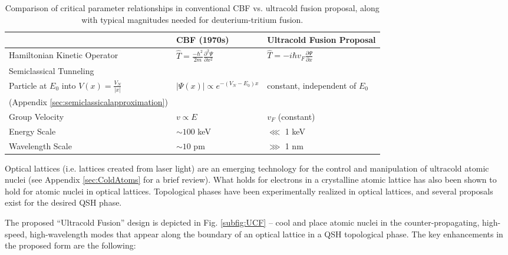 \documentclass[onecolumn,
               superscriptaddress,
               floatfix,
               longbibliography, 
               showkeys,apl]{revtex4-2}
\begin{document}
\begin{table}[h!]
\centering
\begin{tabular}{|M||M|M|}
 \hline
 &CBF (1970s)&Ultracold Fusion Proposal\\
 \hline
  Hamiltonian Kinetic Operator&$\hat{T} = \frac{-\hbar^2}{2m}\frac{\partial^2 \Psi}{\partial x^2}$&$\hat{T}=-i\hbar v_F\frac{\partial \Psi}{\partial x}$\\
 \hline
 Semiclassical Tunneling && \\
 Particle at $E_0$ into $V(x)=\frac{V_N}{|x|}$&$|\Psi(x)|\propto e^{-(V_N-E_0)x}$&constant, independent of $E_0$\\
 (Appendix \ref{sec:semiclassicalapproximation}) && \\
 \hline
 Group Velocity&$v\propto E$&$v_F$ (constant)\\
 \hline
 \hline
 Energy Scale&$\sim100$ keV&$\lll$ 1 keV\\
 \hline
 Wavelength Scale&$\sim 10$ pm&$\ggg$ 1 nm\\
 \hline
\end{tabular}
\caption{Comparison of critical parameter relationships in conventional CBF vs. ultracold fusion proposal, along with typical magnitudes needed for deuterium-tritium fusion.}
\label{tab:dispersion}
\end{table}

Optical lattices (i.e. lattices created from laser light) are an emerging technology for the control and manipulation of ultracold atomic nuclei (see Appendix \ref{sec:ColdAtoms} for a brief review). What holds for electrons in a crystalline atomic lattice has also been shown to hold for atomic nuclei in optical lattices. Topological phases have been experimentally realized in optical lattices, and several proposals exist for the desired QSH phase.

The proposed ``Ultracold Fusion'' design is depicted in Fig. \ref{subfig:UCF} -- cool and place atomic nuclei in the counter-propagating, high-speed, high-wavelength modes that appear along the boundary of an optical lattice in a QSH topological phase. The key enhancements in the proposed form are the following:
\end{document}
